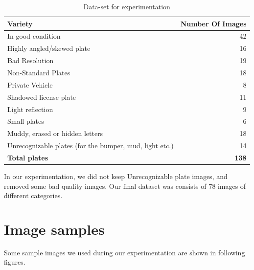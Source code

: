 \documentclass{standalone}
\begin{document}
\begin{table}    
    \caption{Data-set for experimentation}
    \label{table:Variety}
    \begin{tabular}{|l|r|}
    \hline
    {\bf Variety}  &  {\bf Number Of Images} \\ 
    \hline 
    In good condition &  42 \\ 
    Highly angled/skewed plate & 16 \\
    Bad Resolution & 19 \\ 
    Non-Standard Plates &  18\\    
    Private Vehicle & 8 \\
    Shadowed license plate & 11 \\    
    Light reflection & 9 \\
    Small plates & 6\\
    Muddy, erased or hidden letters & 18 \\
    Unrecognizable plates (for the bumper, mud, light etc.) & 14  \\
    \hline
    {\bf Total plates} & {\bf 138} \\
    \hline
    \end{tabular}
\end{table}

In our experimentation, we did not keep Unrecognizable plate images, and removed some bad quality images. Our final dataset was consists of $78$ images of different categories.

\section{Image samples}
Some sample images we used during our experimentation are shown in following figures.
\end{document}
